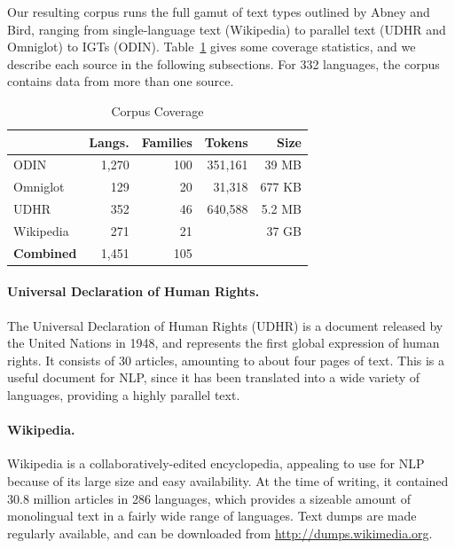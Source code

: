 Our resulting corpus runs the full gamut of text types outlined by Abney and Bird, ranging from single-language text (Wikipedia) to parallel text (UDHR and Omniglot) to IGTs (ODIN). Table~\ref{table:corpus} gives some coverage statistics, and we describe each source in the following subsections.  For 332 languages, the corpus contains data from more than one source.


\begin{table}[t]
\small
\centering
    \begin{tabular}{l|rr|rr}
    ~         				& Langs. 	& Families 	& Tokens		& Size	\\ \hline
    ODIN      				& 1,270      & 100       		& 351,161		& 39 MB		\\
    Omniglot  				& 129        & 20        		& 31,318		& 677 KB	\\
    UDHR      				& 352        & 46        		& 640,588		& 5.2 MB	\\
    Wikipedia 				& 271        & 21       		&				& 37 GB\\ \hline
    \textbf{Combined}	    & 1,451	    & 105 
    \end{tabular}
\caption{Corpus Coverage}
\label{table:corpus}
\end{table}



\paragraph{Universal Declaration of Human Rights.}

The Universal Declaration of Human Rights (UDHR) is a document released by the United Nations in 1948, and represents the first global expression of human rights. It consists of 30 articles, amounting to about four pages of text. This is a useful document for NLP, since it has been translated into a wide variety of languages, providing a highly parallel text.


\paragraph{Wikipedia.}

Wikipedia is a collaboratively-edited encyclopedia, appealing to use for NLP because of its large size and easy availability. At the time of writing, it contained 30.8 million articles in 286 languages, which provides a sizeable amount of monolingual text in a fairly wide range of languages. Text dumps are made regularly available, and can be downloaded from \url{http://dumps.wikimedia.org}.


